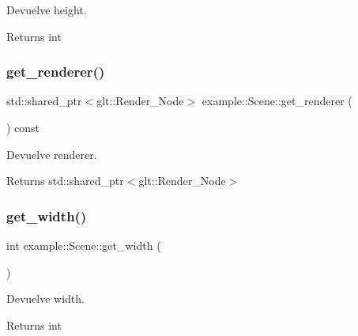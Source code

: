 Devuelve height. 

\begin{DoxyReturn}{Returns}
int 
\end{DoxyReturn}
\mbox{\label{classexample_1_1_scene_a573c73dc4d15f6b08212c297c91c79e3}} 
\subsubsection{\texorpdfstring{get\_renderer()}{get\_renderer()}}
{\footnotesize\ttfamily std\+::shared\+\_\+ptr$<$glt\+::\+Render\+\_\+\+Node$>$ example\+::\+Scene\+::get\+\_\+renderer (\begin{DoxyParamCaption}{ }\end{DoxyParamCaption}) const\hspace{0.3cm}{\ttfamily [inline]}}



Devuelve renderer. 

\begin{DoxyReturn}{Returns}
std\+::shared\+\_\+ptr$<$glt\+::\+Render\+\_\+\+Node$>$ 
\end{DoxyReturn}
\mbox{\label{classexample_1_1_scene_ac29a51e28d223428f95a23b48bc02710}} 
\subsubsection{\texorpdfstring{get\_width()}{get\_width()}}
{\footnotesize\ttfamily int example\+::\+Scene\+::get\+\_\+width (\begin{DoxyParamCaption}{ }\end{DoxyParamCaption})\hspace{0.3cm}{\ttfamily [inline]}}



Devuelve width. 

\begin{DoxyReturn}{Returns}
int 
\end{DoxyReturn}
\mbox{\label{classexample_1_1_scene_a5cd57b45091b1b472dadd75810e1cc0a}} 
